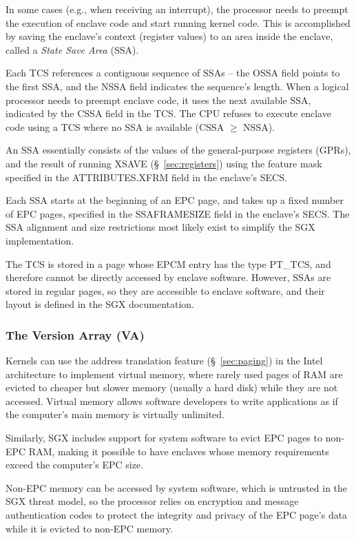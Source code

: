 In some cases (e.g., when receiving an interrupt), the processor needs to
preempt the execution of enclave code and start running kernel code. This is
accomplished by saving the enclave's context (register values) to an area
inside the enclave, called a \textit{State Save Area} (SSA).

Each TCS references a contiguous sequence of SSAs -- the OSSA field points to
the first SSA, and the NSSA field indicates the sequence's length. When a
logical processor needs to preempt enclave code, it uses the next available
SSA, indicated by the CSSA field in the TCS. The CPU refuses to execute enclave
code using a TCS where no SSA is available (CSSA $\ge$ NSSA).

An SSA essentially consists of the values of the general-purpose registers
(GPRs), and the result of running XSAVE (\S~\ref{sec:registers}) using the
feature mask specified in the ATTRIBUTES.XFRM field in the enclave's SECS.


Each SSA starts at the beginning of an EPC page, and takes up a fixed number of
EPC pages, specified in the SSAFRAMESIZE field in the enclave's SECS. The SSA
alignment and size restrictions most likely exist to simplify the SGX
implementation.

The TCS is stored in a page whose EPCM entry has the type PT\_TCS, and
therefore cannot be directly accessed by enclave software. However, SSAs are
stored in regular pages, so they are accessible to enclave software, and their
layout is defined in the SGX documentation.

\subsubsection{The Version Array (VA)}
\label{sec:va}

Kernels can use the address translation feature (\S~\ref{sec:paging}) in the
Intel architecture to implement virtual memory, where rarely used pages of RAM
are evicted to cheaper but slower memory (usually a hard disk) while they are
not accessed. Virtual memory allows software developers to write applications
as if the computer's main memory is virtually unlimited.

Similarly, SGX includes support for system software to evict EPC pages to
non-EPC RAM, making it possible to have enclaves whose memory requirements
exceed the computer's EPC size.

Non-EPC memory can be accessed by system software, which is untrusted in the
SGX threat model, so the processor relies on encryption and message
authentication codes to protect the integrity and privacy of the EPC page's
data while it is evicted to non-EPC memory.



